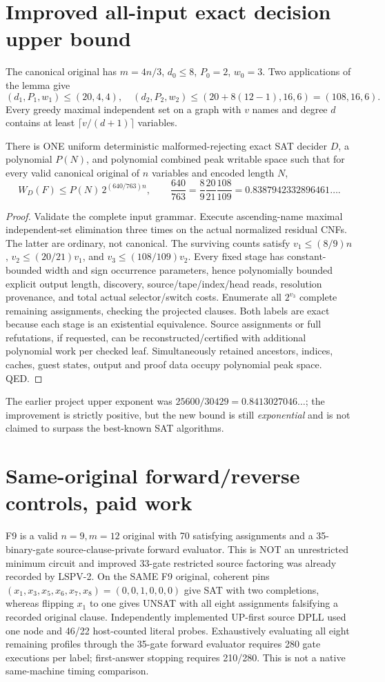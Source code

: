 \documentclass[11pt]{article}
\begin{document}
\section{Improved all-input exact decision upper bound}
The canonical original has $m=4n/3$, $d_0\le8$, $P_0=2$, $w_0=3$. Two applications of the lemma give
\[
(d_1,P_1,w_1)\le(20,4,4),\quad
(d_2,P_2,w_2)\le(20+8(12-1),16,6)=(108,16,6).
\]
Every greedy maximal independent set on a graph with $v$ names and degree $d$ contains at least $\lceil v/(d+1)\rceil$ variables.
\begin{theorem}
There is ONE uniform deterministic malformed-rejecting exact SAT decider $D$, a polynomial $P(N)$, and polynomial combined peak writable space such that for every valid canonical original of $n$ variables and encoded length $N$,
\[
\boxed{W_D(F)\le P(N)\,2^{(640/763)n}},\qquad
\frac{640}{763}=\frac89\frac{20}{21}\frac{108}{109}=0.8387942332896461\ldots.
\]
\end{theorem}
\begin{proof}
Validate the complete input grammar. Execute ascending-name maximal independent-set elimination three times on the actual normalized residual CNFs. The latter are ordinary, not canonical. The surviving counts satisfy $v_1\le(8/9)n$, $v_2\le(20/21)v_1$, and $v_3\le(108/109)v_2$. Every fixed stage has constant-bounded width and sign occurrence parameters, hence polynomially bounded explicit output length, discovery, source/tape/index/head reads, resolution provenance, and total actual selector/switch costs. Enumerate all $2^{v_3}$ complete remaining assignments, checking the projected clauses. Both labels are exact because each stage is an existential equivalence. Source assignments or full refutations, if requested, can be reconstructed/certified with additional polynomial work per checked leaf. Simultaneously retained ancestors, indices, caches, guest states, output and proof data occupy polynomial peak space. QED.
\end{proof}
The earlier project upper exponent was $25600/30429=0.8413027046\ldots$; the improvement is strictly positive, but the new bound is still \emph{exponential} and is not claimed to surpass the best-known SAT algorithms.
\section{Same-original forward/reverse controls, paid work}
F9 is a valid $n=9,m=12$ original with 70 satisfying assignments and a 35-binary-gate source-clause-private forward evaluator. This is NOT an unrestricted minimum circuit and improved 33-gate restricted source factoring was already recorded by LSPV-2. On the SAME F9 original, coherent pins $(x_1,x_3,x_5,x_6,x_7,x_8)=(0,0,1,0,0,0)$ give SAT with two completions, whereas flipping $x_1$ to one gives UNSAT with all eight assignments falsifying a recorded original clause. Independently implemented UP-first source DPLL used one node and 46/22 host-counted literal probes. Exhaustively evaluating all eight remaining profiles through the 35-gate forward evaluator requires 280 gate executions per label; first-answer stopping requires 210/280. This is not a native same-machine timing comparison.
\end{document}
